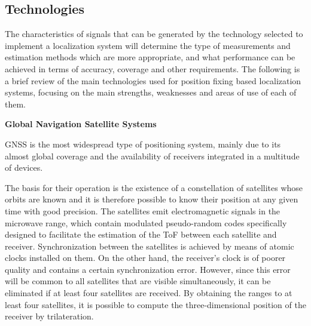 \subsection{Technologies}
\label{sec:2_2_3_technologies}		
The characteristics of signals that can be generated by the technology selected to implement a localization system will determine the type of measurements and estimation methods which are more appropriate, and what performance can be achieved in terms of accuracy, coverage and other requirements.
The following is a brief review of the main technologies used for position fixing based localization systems, focusing on the main strengths, weaknesses and areas of use of each of them.
\begin{description}
	\item \textbf{Global Navigation Satellite Systems}
		
	GNSS is the most widespread type of positioning system, mainly due to its almost global coverage and the availability of receivers integrated in a multitude of devices.
	
	The basis for their operation is the existence of a constellation of satellites whose orbits are known and it is therefore possible to know their position at any given time with good precision.
	The satellites emit electromagnetic signals in the microwave range, which contain modulated pseudo-random codes specifically designed to facilitate the estimation of the ToF between each satellite and receiver.
	Synchronization between the satellites is achieved by means of atomic clocks installed on them.
	On the other hand, the receiver's clock is of poorer quality and contains a certain synchronization error. However, since this error will be common to all satellites that are visible simultaneously, it can be eliminated if at least four satellites are received.
	By obtaining the ranges to at least four satellites, it is possible to compute the three-dimensional position of the receiver by trilateration.	


\end{description}
